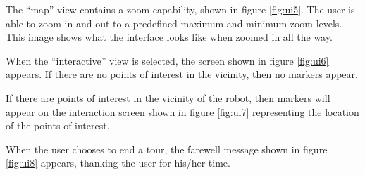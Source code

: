 \documentclass[11pt]{report}
\begin{document}
The “map” view contains a zoom capability, shown in figure \ref{fig:ui5}. The user is able to zoom in and out to a predefined maximum and minimum zoom levels. This image shows what the interface looks like when zoomed in all the way.

When the “interactive” view is selected, the screen shown in figure \ref{fig:ui6} appears. If there are no points of interest in the vicinity, then no markers appear.

If there are points of interest in the vicinity of the robot, then markers will appear on the interaction screen shown in figure \ref{fig:ui7} representing the location of the points of interest.

When the user chooses to end a tour, the farewell message shown in figure \ref{fig:ui8} appears, thanking the user for his/her time.
\end{document}
